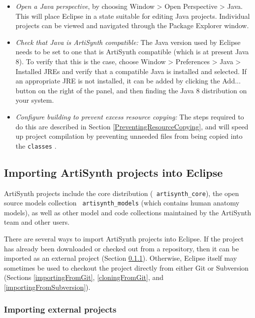 \begin{itemize}

\item {\it Open a Java perspective}, by choosing {\sf Window > Open Perspective >
Java}. This will place Eclipse in a state suitable for editing Java
projects. Individual projects can be viewed and navigated through the
{\sf Package Explorer} window.

\item {\it Check that Java is ArtiSynth compatible:}
The Java version used by Eclipse needs to be set to one that is
ArtiSynth compatible (which is at present Java 8).  To verify that
this is the case, choose {\sf Window > Preferences > Java > Installed
JREs} and verify that a compatible Java is installed and selected. If
an appropriate JRE is not installed, it can be added by clicking the
{\sf Add...} button on the right of the panel, and then finding the
Java 8 distribution on your system.

\item {\it Configure building to prevent excess resource copying:}
The steps required to do this are described in Section
\ref{PreventingResourceCopying}, and will speed up project
compilation by preventing unneeded files from being copied into the
{\tt classes} \directory{}.

\end{itemize}

\subsection{Importing ArtiSynth projects into Eclipse}

ArtiSynth projects include the core distribution ({\tt
artisynth\_core}), the open source models collection {\tt
artisynth\_models} (which contains human anatomy models), as well as
other model and code collections maintained by the ArtiSynth team and
other users.

There are several ways to import ArtiSynth projects into Eclipse.  If
the project has already been downloaded or checked out from a
repository, then it can be imported as an external project
(Section \ref{importingExternalProjects}). Otherwise, Eclipse itself
may sometimes be used to checkout the project directly from either Git
or Subversion (Sections \ref{importingFromGit},
\ref{cloningFromGit}, and \ref{importingFromSubversion}).

\subsubsection{Importing external projects}
\label{importingExternalProjects}

